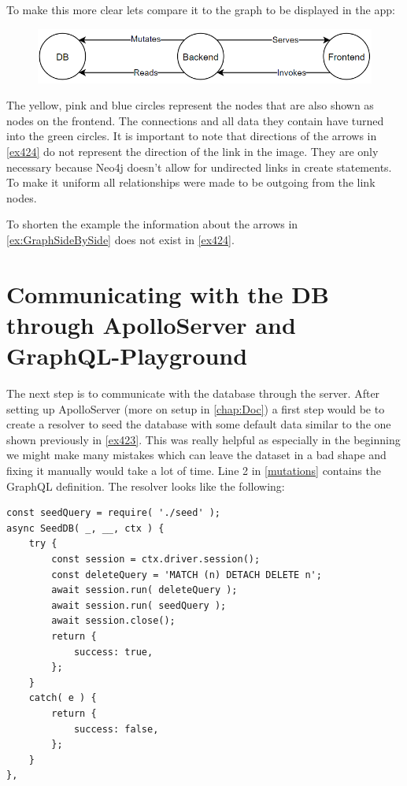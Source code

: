 To make this more clear lets compare it to the graph to be displayed in the app:
\begin{figure}[H]
\centering
\includegraphics[scale=.8]{Bilder/BasicGraph.png}
\label{ex:GraphSideBySide}
\end{figure}

The yellow, pink and blue circles represent the nodes that are also shown as nodes on the frontend. The connections and all data they contain have turned into the green circles. It is important to note that directions of the arrows in \autoref{ex424} do not represent the direction of the link in the image. They are only necessary because Neo4j doesn't allow for undirected links in create statements. To make it uniform all relationships were made to be outgoing from the link nodes.

To shorten the example the information about the arrows in \autoref{ex:GraphSideBySide} does not exist in \autoref{ex424}. 

\section{Communicating with the DB through ApolloServer and GraphQL-Playground}
The next step is to communicate with the database through the server. After setting up ApolloServer (more on setup in \autoref{chap:Doc}) a first step would be to create a resolver to seed the database with some default data similar to the one shown previously in \autoref{ex423}. This was really helpful as especially in the beginning we might make many mistakes which can leave the dataset in a bad shape and fixing it manually would take a lot of time. Line 2 in \autoref{mutations} contains the GraphQL definition. 
\newpage
The resolver looks like the following:
\lstset{language=JavaScript}
\begin{lstlisting}[caption={Seed Resolver}]
const seedQuery = require( './seed' );
async SeedDB( _, __, ctx ) {
	try {
		const session = ctx.driver.session();
		const deleteQuery = 'MATCH (n) DETACH DELETE n';
		await session.run( deleteQuery );
		await session.run( seedQuery );
		await session.close();
		return {
			success: true,
		};
	}
	catch( e ) {
		return {
			success: false,
		};	
	}
},
\end{lstlisting}

